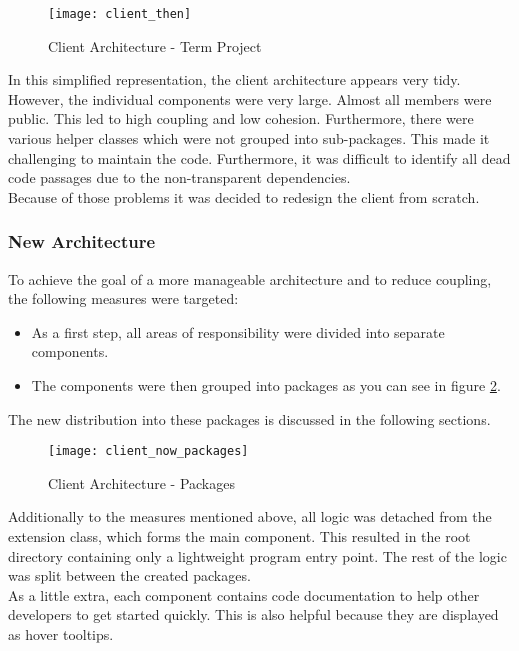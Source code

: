 \begin{figure}[H]
    \centering
    \texttt{[image: client\_then]}
    \caption{Client Architecture - Term Project}
    \label{fig:client_then}
\end{figure}

In this simplified representation, the client architecture appears very tidy.
However, the individual components were very large.
Almost all members were public.
This led to high coupling and low cohesion.
Furthermore, there were various helper classes which were not grouped into sub-packages.
This made it challenging to maintain the code.
Furthermore, it was difficult to identify all dead code passages due to the non-transparent dependencies.\\

Because of those problems it was decided to redesign the client from scratch.

\subsubsection{New Architecture}
To achieve the goal of a more manageable architecture and to reduce coupling, the following measures were targeted:
\begin{itemize}
    \item As a first step, all areas of responsibility were divided into separate components.
    \item The components were then grouped into packages as you can see in figure \ref{fig:client_now_packages}.
\end{itemize}
The new distribution into these packages is discussed in the following sections.\\

\begin{figure}[H]
    \centering
    \texttt{[image: client\_now\_packages]}
    \caption{Client Architecture - Packages}
    \label{fig:client_now_packages}
\end{figure}

Additionally to the measures mentioned above, all logic was detached from the extension class, which forms the main component.
This resulted in the root directory containing only a lightweight program entry point.
The rest of the logic was split between the created packages.\\

As a little extra, each component contains code documentation to help other developers to get started quickly.
This is also helpful because they are displayed as hover tooltips.\\

